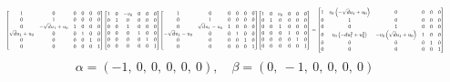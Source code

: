\documentclass[11pt]{article}
\theoremstyle{definition}
\begin{document}
\[
\scaletoalign{\textwidth}{{\left[\begin{matrix}1 & 0 & 0 & 0 & 0 & 0\\0 & 1 & 0 & 0 & 0 & 0\\0 & - \sqrt{d} u_{1} + u_{0} & 1 & 0 & 0 & 0\\\sqrt{d} u_{1} + u_{0} & 0 & 0 & 1 & 0 & 0\\0 & 0 & 0 & 0 & 1 & 0\\0 & 0 & 0 & 0 & 0 & 1\end{matrix}\right]} {\left[\begin{matrix}1 & 0 & - v_{0} & 0 & 0 & 0\\0 & 1 & 0 & 0 & 0 & 0\\0 & 0 & 1 & 0 & 0 & 0\\0 & 0 & 0 & 1 & 0 & 0\\0 & 0 & 0 & 0 & 1 & 0\\0 & 0 & 0 & 0 & 0 & 1\end{matrix}\right]} {\left[\begin{matrix}1 & 0 & 0 & 0 & 0 & 0\\0 & 1 & 0 & 0 & 0 & 0\\0 & \sqrt{d} u_{1} - u_{0} & 1 & 0 & 0 & 0\\- \sqrt{d} u_{1} - u_{0} & 0 & 0 & 1 & 0 & 0\\0 & 0 & 0 & 0 & 1 & 0\\0 & 0 & 0 & 0 & 0 & 1\end{matrix}\right]} {\left[\begin{matrix}1 & 0 & v_{0} & 0 & 0 & 0\\0 & 1 & 0 & 0 & 0 & 0\\0 & 0 & 1 & 0 & 0 & 0\\0 & 0 & 0 & 1 & 0 & 0\\0 & 0 & 0 & 0 & 1 & 0\\0 & 0 & 0 & 0 & 0 & 1\end{matrix}\right]} = {\left[\begin{matrix}1 & v_{0} \left(- \sqrt{d} u_{1} + u_{0}\right) & 0 & 0 & 0 & 0\\0 & 1 & 0 & 0 & 0 & 0\\0 & 0 & 1 & 0 & 0 & 0\\0 & v_{0} \left(- d u_{1}^{2} + u_{0}^{2}\right) & - v_{0} \left(\sqrt{d} u_{1} + u_{0}\right) & 1 & 0 & 0\\0 & 0 & 0 & 0 & 1 & 0\\0 & 0 & 0 & 0 & 0 & 1\end{matrix}\right]}}
\]
\[
\alpha = \left( -1, \  0, \  0, \  0, \  0, \  0\right), \quad \beta = \left( 0, \  -1, \  0, \  0, \  0, \  0\right)
\]
\end{document}
